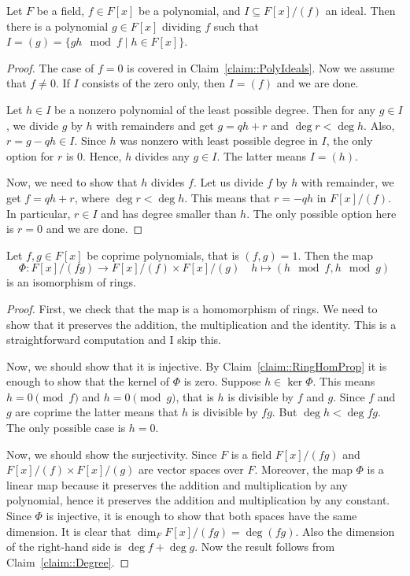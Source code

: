 \begin{claim}
\label{claim::PolyRemIdeals}
Let $F$ be a field, $f\in F[x]$ be a polynomial, and $I\subseteq F[x]/ (f)$ an ideal.
Then there is a polynomial $g\in F[x]$ dividing $f$ such that $I = (g) = \{g h\!\!\mod{f}\mid h\in F[x]\}$.
\end{claim}
\begin{proof}
The case of $f = 0$ is covered in Claim~\ref{claim::PolyIdeals}.
Now we assume that $f\neq 0$.
If $I$ consists of the zero only, then $I = (f)$ and we are done.

Let $h\in I$ be a nonzero polynomial of the least possible degree.
Then for any $g\in I$, we divide $g$ by $h$ with remainders and get $g = qh + r$ and $\deg r < \deg h$.
Also, $r = g - qh\in I$.
Since $h$ was nonzero with least possible degree in $I$, the only option for $r$ is $0$.
Hence, $h$ divides any $g\in I$.
The latter means $I = (h)$.

Now, we need to show that $h$ divides $f$.
Let us divide $f$ by $h$ with remainder, we get $f = qh + r$, where $\deg r < \deg h$.
This means that $r = -qh$ in $F[x]/(f)$.
In particular, $r\in I$ and has degree smaller than $h$.
The only possible option here is $r = 0$ and we are done.
\end{proof}


\begin{claim}
Let $f, g\in F[x]$ be coprime polynomials, that is $(f, g) = 1$.
Then the map
\[
\Phi\colon F[x]/(fg) \to F[x]/(f)\times F[x]/(g)\quad h \mapsto (h\!\!\mod{f},h\!\!\mod{g})
\]
is an isomorphism of rings.
\end{claim}
\begin{proof}
First, we check that the map is a homomorphism of rings.
We need to show that it preserves the addition, the multiplication and the identity.
This is a straightforward computation and I skip this.

Now, we should show that it is injective.
By Claim~\ref{claim::RingHomProp} it is enough to show that the kernel of $\Phi$ is zero.
Suppose $h\in \ker \Phi$.
This means $h = 0 \pmod f$ and $h = 0 \pmod g$, that is $h$ is divisible by $f$ and $g$.
Since $f$ and $g$ are coprime the latter means that $h$ is divisible by $fg$.
But $\deg h < \deg fg$.
The only possible case is $h = 0$.

Now, we should show the surjectivity.
Since $F$ is a field $F[x]/(fg)$ and $F[x]/(f)\times F[x]/(g)$ are vector spaces over $F$.
Moreover, the map $\Phi$ is a linear map because it preserves the addition and multiplication by any polynomial, hence it preserves the addition and multiplication by any constant.
Since $\Phi$ is injective, it is enough to show that both spaces have the same dimension.
It is clear that $\dim_F F[x]/(fg) = \deg(fg)$.
Also the dimension of the right-hand side is $\deg f + \deg g$.
Now the result follows from Claim~\ref{claim::Degree}.
\end{proof}
